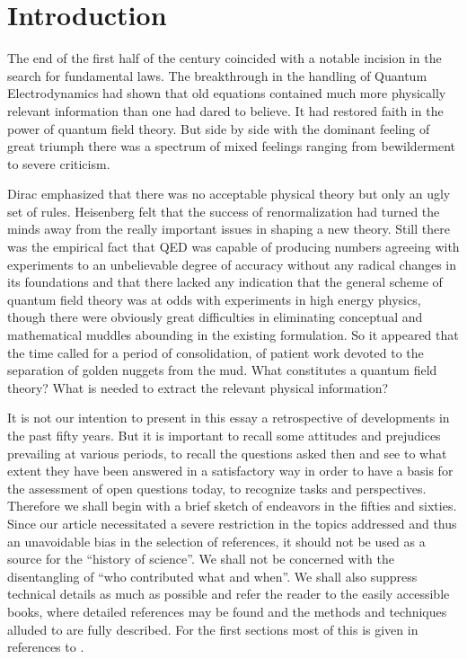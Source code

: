 \section{Introduction}
\setcounter{equation}{0} 

The end of the first half of the century coincided with a notable
incision in the search for fundamental laws. The
breakthrough in the handling of Quantum Electrodynamics had shown that
old equations contained much more physically relevant information than
one had dared to believe. It had restored faith in the power of
quantum field theory. 
But side by side with the dominant feeling of
great triumph there was a spectrum of mixed feelings ranging from
bewilderment to severe criticism. 

Dirac emphasized that there was no
acceptable physical theory but only an ugly set of rules. Heisenberg
felt that the success of renormalization had turned the minds away
from the really important issues in shaping a new theory. Still there
was the empirical fact that QED was capable of producing numbers
agreeing with experiments to an unbelievable degree of accuracy
without any radical changes in its foundations and that there lacked any
indication that the general scheme of quantum field theory was at odds
with experiments in high energy physics, though there were obviously
great difficulties in eliminating conceptual and mathematical muddles
abounding in the existing formulation. So it appeared that the time
called for a period of consolidation, of patient work devoted to the
separation of golden nuggets from the mud. What constitutes a quantum
field theory? What is needed to extract the relevant physical
information?

It is not our intention to present 
in this essay a retrospective of developments in
the past fifty years. But it is important to recall some attitudes and
prejudices prevailing at various periods, to recall the questions
asked then and see to what extent they have been answered in a
satisfactory way in order to have a basis for the assessment of open
questions today, to recognize tasks and perspectives. Therefore we
shall begin with a brief sketch of endeavors in the fifties and
sixties. Since our article necessitated a severe restriction in 
the topics addressed and thus an unavoidable bias in the 
selection of references, it should not be used as a source for 
the ``history of science''. We shall not be concerned with 
the disentangling of ``who contributed what and when''. We shall
also suppress technical details as much as possible and refer 
the reader to the easily accessible books, where detailed 
references may be found and the methods and techniques alluded 
to are fully described. For the first sections most of this 
is given in references \cite{StWi} to \cite{BoLoTo}. 

